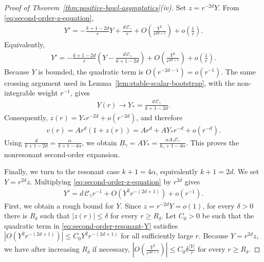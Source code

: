 \documentclass{amsart}
\theoremstyle{plain}
\theoremstyle{mainintrothm}
\theoremstyle{definition}
\begin{document}
\begin{proof}[Proof of Theorem~\ref{thm:positive-bowl-asymptotics}\textup{(iv)}]
		Set $z=r^{-2d}Y$.  From \eqref{eq:second-order-z-equation},
		\begin{align*}
			Y'
			=
			-\frac{k+1-2d}{r}Y
			+
			\frac{d\,\mathcal C_\gamma}{r}
			+
			O\!\left(\frac{Y^2}{r^{2d+1}}\right)
			+
			o\left(\frac{1}{r}\right).
		\end{align*}
		Equivalently,
		\begin{align*}
			Y'
			=
			-\frac{k+1-2d}{r}
			\left(
			Y-
			\frac{d\,\mathcal C_\gamma}{k+1-2d}
			\right)
			+
			O\!\left(\frac{Y^2}{r^{2d+1}}\right)
			+
			o\left(\frac{1}{r}\right).
		\end{align*}
		Because $Y$ is bounded, the quadratic term is $O(r^{-2d-1})=o(r^{-1})$.
		The same crossing argument used in Lemma~\ref{lem:stable-scalar-bootstrap},
		with the non-integrable weight $r^{-1}$, gives
		\begin{align*}
			Y(r)
			\to
			Y_*
			=
			\frac{d\,\mathcal C_\gamma}{k+1-2d}.
		\end{align*}
		Consequently, $z(r)=Y_*r^{-2d}+o(r^{-2d})$, and therefore
		\begin{align*}
			v(r)
			=
			Ar^d(1+z(r))
			=
			Ar^d
			+
			AY_*r^{-d}
			+
			o(r^{-d}).
		\end{align*}
		Using $\frac{d}{k+1-2d}=\frac{\alpha}{k+1-4\alpha}$,
		we obtain $B_\gamma=AY_*=\frac{\alpha A_\gamma\mathcal C_\gamma}{k_\gamma+1-4\alpha}$. This proves the nonresonant second-order expansion.
		
		\medskip
		
		Finally, we turn to the resonant case $k+1=4\alpha$, equivalently
		$k+1=2d$.  We set $Y=r^{2d}z$.  Multiplying
		\eqref{eq:second-order-z-equation} by $r^{2d}$ gives
		\begin{align}
			\label{eq:second-order-resonant-Y}
			Y'=d\,\mathcal C_\gamma r^{-1}
			+
			O\!\left(Y^2r^{-(2d+1)}\right)
			+
			o\left(r^{-1}\right).
		\end{align}
		First, we obtain a rough bound for $Y$.  Since $z=r^{-2d}Y=o(1)$, for every
		$\delta>0$ there is $R_\delta$ such that $|z(r)|\le\delta$ for every $r\ge R_\delta$. Let $C_0>0$ be such that the quadratic term in
		\eqref{eq:second-order-resonant-Y} satisfies $\left|
			O\!\left(Y^2r^{-(2d+1)}\right)\right|\le C_0Y^2r^{-(2d+1)}$ for all sufficiently large $r$.  Because $Y=r^{2d}z$, we have after increasing $R_\delta$ if necessary, $\left|O\!\left(\frac{Y^2}{r^{2d+1}}\right)\right|
			\le C_0\delta\frac{|Y|}{r}$ for every $r\ge R_\delta$.
		

\end{proof}
\end{document}
